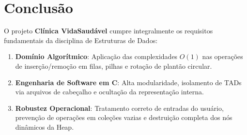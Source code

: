 \documentclass[11pt,a4paper]{article}
\begin{document}
\section{Conclusão}

O projeto \textbf{Clínica VidaSaudável} cumpre integralmente os requisitos fundamentais da disciplina de Estruturas de Dados:
\begin{enumerate}
    \item \textbf{Domínio Algorítmico}: Aplicação das complexidades $O(1)$ nas operações de inserção/remoção em filas, pilhas e rotação de plantão circular.
    \item \textbf{Engenharia de Software em C}: Alta modularidade, isolamento de TADs via arquivos de cabeçalho e ocultação da representação interna.
    \item \textbf{Robustez Operacional}: Tratamento correto de entradas do usuário, prevenção de operações em coleções vazias e destruição completa dos nós dinâmicos da Heap.
\end{enumerate}
\end{document}
